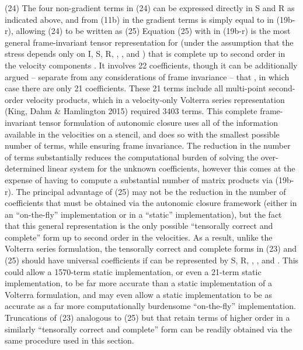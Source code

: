                    (24)
The four non-gradient terms in (24) can be expressed directly in S and R as indicated above, and from (11b)   in the gradient terms is simply equal to   in (19b-r), allowing (24) to be written as
    (25)
Equation (25) with   in (19b-r) is the most general frame-invariant tensor representation for   (under the assumption that the stress depends only on I, S, R,  ,  , and  ) that is complete up to second order in the velocity components  .  It involves 22 coefficients, though it can be additionally argued – separate from any considerations of frame invariance – that  , in which case there are only 21 coefficients. 
These 21 terms include all multi-point second-order velocity products, which in a velocity-only Volterra series representation (King, Dahm & Hamlington 2015) required 3403 terms. This complete frame-invariant tensor formulation of autonomic closure uses all of the information available in the velocities on a   stencil, and does so with the smallest possible number of terms, while ensuring frame invariance. The reduction in the number of terms substantially reduces the computational burden of solving the over-determined linear system for the unknown coefficients, however this comes at the expense of having to compute a substantial number of matrix products   via (19b-r).
The principal advantage of (25) may not be the reduction in the number of coefficients that must be obtained via the autonomic closure framework (either in an “on-the-fly” implementation or in a “static” implementation), but the fact that this general representation is the only possible “tensorally correct and complete” form up to second order in the velocities. As a result, unlike the Volterra series formulation, the tensorally correct and complete forms in (23) and (25) should have universal coefficients   if   can be represented by S, R,  ,  , and  . This could allow a 1570-term static implementation, or even a 21-term static implementation, to be far more accurate than a static implementation of a Volterra formulation, and may even allow a static implementation to be as accurate as a far more computationally burdensome “on-the-fly” implementation.   
Truncations of (23) analogous to (25) but that retain terms of higher order in a similarly “tensorally correct and complete” form can be readily obtained via the same procedure used in this section. 




